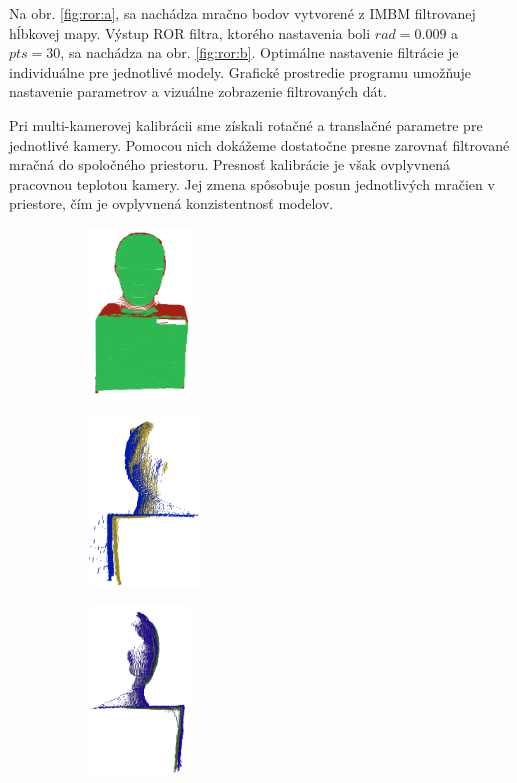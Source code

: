 Na obr. \ref{fig:ror:a}, sa nachádza mračno bodov vytvorené z IMBM filtrovanej hĺbkovej mapy. Výstup ROR filtra, ktorého nastavenia boli $rad=0.009$ a $pts=30$, sa nachádza na obr. \ref{fig:ror:b}. Optimálne nastavenie filtrácie je individuálne pre jednotlivé modely. Grafické prostredie programu umožňuje nastavenie parametrov a vizuálne zobrazenie filtrovaných dát. 

Pri multi-kamerovej kalibrácii sme získali rotačné a translačné parametre pre jednotlivé kamery. Pomocou nich dokážeme dostatočne presne zarovnať filtrované mračná do spoločného priestoru. Presnosť kalibrácie je však ovplyvnená pracovnou teplotou kamery. Jej zmena spôsobuje posun jednotlivých mračien v priestore, čím je ovplyvnená konzistentnosť modelov.

\begin{figure}[h]
	\centering
	\begin{subfigure}[b]{0.32\textwidth}
		\centering
		\includegraphics[height=4.5cm]{figures/icp1.png}
		\caption{}
		\label{fig:icp:a}
	\end{subfigure}
	\hfill
	\begin{subfigure}[b]{0.32\textwidth}
		\centering
		\includegraphics[height=4.5cm]{figures/icp0.png}
		\caption{}
		\label{fig:icp:b}
	\end{subfigure}
	\hfill
	\begin{subfigure}[b]{0.32\textwidth}
		\centering
		\includegraphics[height=4.5cm]{figures/icp2.png}

\end{subfigure}
\end{figure}
